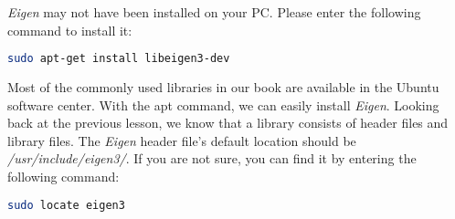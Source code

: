 \textit{Eigen} may not have been installed on your PC. Please enter the following command to install it:

\begin{lstlisting}[language=sh,caption=Terminal input:]
sudo apt-get install libeigen3-dev
\end{lstlisting}

Most of the commonly used libraries in our book are available in the Ubuntu software center. With the apt command, we can easily install \textit{Eigen}. Looking back at the previous lesson, we know that a library consists of header files and library files. The \textit{Eigen} header file's default location should be  \textit{/usr/include/eigen3/}. If you are not sure, you can find it by entering the following command:

\begin{lstlisting}[language=sh,caption=Terminal input:]
sudo locate eigen3
\end{lstlisting}

